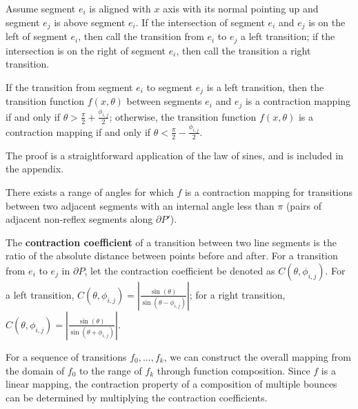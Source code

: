 \documentclass[]{styles/svproc}  %
\begin{document}
\begin{definition}
Assume segment $e_i$ is aligned with $x$ axis with its normal pointing up and
segment $e_j$ is above segment $e_i$. If the intersection of segment $e_i$ and
$e_j$ is
on the left of segment $e_i$, then call the transition from $e_i$ to $e_j$ a left
transition; if the intersection is on the right of segment $e_i$, then call the
transition a right transition.
\end{definition}
\begin{lemma} \label{lemma:angrange}
If the transition from segment $e_i$ to segment $e_j$ is a left transition, then the
transition function $f(x, \theta)$ between segments $e_i$ and $e_j$ is a contraction
mapping if and only if $\theta > \frac{\pi}{2}+\frac{\phi_{i, j}}{2}$;
otherwise, the transition function $f(x, \theta)$ is a contraction mapping if
and only if $\theta < \frac{\pi}{2}-\frac{\phi_{i, j}}{2}$.
\end{lemma}

The proof is a straightforward application of the law of sines, and is included
in the appendix.

\begin{corollary} \label{coro:existcontract}
There exists a range of angles for which $f$ is a contraction mapping for transitions between two adjacent 
segments with an internal angle less than $\pi$ (pairs of adjacent non-reflex
segments along $\partial P'$).
\end{corollary}

\begin{definition}
The \textbf{contraction coefficient} of a transition between two
line segments is the ratio of the absolute distance between points before and after.
For a transition from $e_i$ to $e_j$ in $\partial P$, let the contraction
coefficient be denoted as $C(\theta, \phi_{i, j})$. 
For a left transition, $C(\theta, \phi_{i, j}) = | \frac{\sin(\theta)}{\sin(\theta - \phi_{i, j})} |$; 
for a right transition,  $C(\theta, \phi_{i, j}) = | \frac{\sin(\theta)}{\sin(\theta + \phi_{i, j})} |$.
\end{definition}

For a sequence of transitions $f_0, \ldots, f_k$, we can construct the overall
mapping from the domain of $f_0$ to the range of $f_k$ through function
composition. Since $f$ is a linear mapping, the contraction property of a composition 
of multiple bounces can be determined by multiplying the contraction
coefficients.
\end{document}
